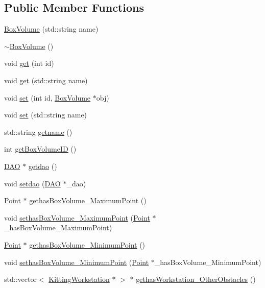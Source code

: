 \subsection*{Public Member Functions}
\begin{DoxyCompactItemize}
\item 
\hyperlink{class_box_volume_a495b367deb4c129983ed0771b9dd2d2b}{BoxVolume} (std::string name)
\item 
\hyperlink{class_box_volume_a5fdd6ea10bfcc6a1346840201afb3d51}{$\sim$BoxVolume} ()
\item 
void \hyperlink{class_box_volume_ad5470426b7ed060920fb0cd701a0eba7}{get} (int id)
\item 
void \hyperlink{class_box_volume_a332f433a35f192739f3570d4c8941b6a}{get} (std::string name)
\item 
void \hyperlink{class_box_volume_a5c5491a4aa1cb62946278dd3dcb91c4c}{set} (int id, \hyperlink{class_box_volume}{BoxVolume} $\ast$obj)
\item 
void \hyperlink{class_box_volume_a4aa7c183fec52b57fab6d509e5e87e5a}{set} (std::string name)
\item 
std::string \hyperlink{class_box_volume_a786f06a3a9b3c1feff8aa120b449f5de}{getname} ()
\item 
int \hyperlink{class_box_volume_a5774356e256f0574ad127371f5440fa1}{getBoxVolumeID} ()
\item 
\hyperlink{class_d_a_o}{DAO} $\ast$ \hyperlink{class_box_volume_ab39b3c8e7c434e9a963f5c538b3ee84e}{getdao} ()
\item 
void \hyperlink{class_box_volume_ad186a540505ac006ee58952ecaed35f8}{setdao} (\hyperlink{class_d_a_o}{DAO} $\ast$\_\-dao)
\item 
\hyperlink{class_point}{Point} $\ast$ \hyperlink{class_box_volume_ac71541715b68c7e97b404fadcb48e07c}{gethasBoxVolume\_\-MaximumPoint} ()
\item 
void \hyperlink{class_box_volume_ae120badf25eb21e24a200040ace7446f}{sethasBoxVolume\_\-MaximumPoint} (\hyperlink{class_point}{Point} $\ast$\_\-hasBoxVolume\_\-MaximumPoint)
\item 
\hyperlink{class_point}{Point} $\ast$ \hyperlink{class_box_volume_a735604b17ddf91a2562f40e0a03dd74f}{gethasBoxVolume\_\-MinimumPoint} ()
\item 
void \hyperlink{class_box_volume_aa08d6ff0a471dde03302c6672c5d4323}{sethasBoxVolume\_\-MinimumPoint} (\hyperlink{class_point}{Point} $\ast$\_\-hasBoxVolume\_\-MinimumPoint)
\item 
std::vector$<$ \hyperlink{class_kitting_workstation}{KittingWorkstation} $\ast$ $>$ $\ast$ \hyperlink{class_box_volume_a4676f494bb76933d5c9cd8777b2187d4}{gethasWorkstation\_\-OtherObstacles} ()

\end{DoxyCompactItemize}
